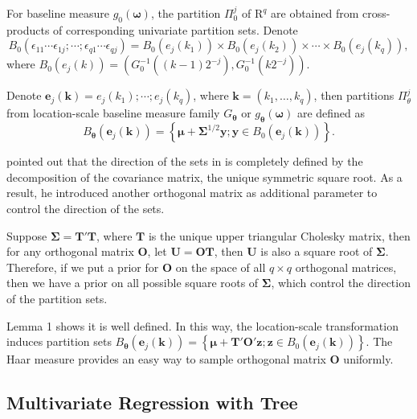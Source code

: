 For baseline measure $g_0(\bm{\omega})$, the partition $\Pi_0^j$ of
$\mathrm{R}^q$ are obtained from cross-products of corresponding
univariate partition sets. Denote
$$B_0( \epsilon_{11}\cdots
\epsilon_{1j};\cdots;\epsilon_{q1}\cdots\epsilon_{qj}) = B_0(e_j(k_1))
\times B_0(e_j(k_2)) \times \cdots \times B_0(e_j(k_q)),$$ where
$B_0(e_j(k))= \left( G_0^{-1}((k-1)2^{-j}), G_0^{-1}(k2^{-j})
\right)$.

Denote $\bm{e}_j(\bm{k})= e_j(k_1); \cdots;e_j(k_q)$, where $\bm{k}=
(k_1, \ldots, k_q)$, then partitions $\Pi_{\theta}^j$ from
location-scale baseline measure family $G_{\bm{\theta}}$ or
$g_{\bm{\theta}}(\bm{\omega})$ are defined as
\begin{displaymath}
  B_{\bm{\theta}}(\bm{e}_j(\bm{k})) = \left\{ \bm{\mu} +
    \bm{\Sigma}^{1/2} \bm{y}; \bm{y} \in B_0(\bm{e}_j(\bm{k})) \right\}.
\end{displaymath}

\citet{jara2009} pointed out that the direction of the sets in
\citet{hanson2006} is completely defined by the decomposition of the
covariance matrix, the unique symmetric square root. As a result, he
introduced another orthogonal matrix as additional parameter to
control the direction of the sets.

Suppose $\bm{\Sigma} = \bm{T'T}$, where $\bm{T}$ is the unique upper
triangular Cholesky matrix, then for any orthogonal matrix $\bm{O}$,
let $\bm{U=OT}$, then $\bm{U}$ is also a square root of
$\bm{\Sigma}$. Therefore, if we put a prior for $\bm{O}$ on the space
of all $q \times q$ orthogonal matrices, then we have a prior on all
possible square roots of $\bm{\Sigma}$, which control the direction of
the partition sets.

Lemma 1 \citep{jara2009} shows it is well
defined. In this way, the location-scale transformation induces
partition sets $B_{\bm{\theta}}(\bm{e}_j(\bm{k})) = \left\{ \bm{\mu} +
  \bm{T'O'} \bm{z}; \bm{z} \in B_0(\bm{e}_j(\bm{k})) \right\}.$ The
Haar measure \citep{halmos1950} provides an easy way to sample
orthogonal matrix $\bm{O}$ uniformly.

\subsection{Multivariate Regression with \polya{} Tree}

